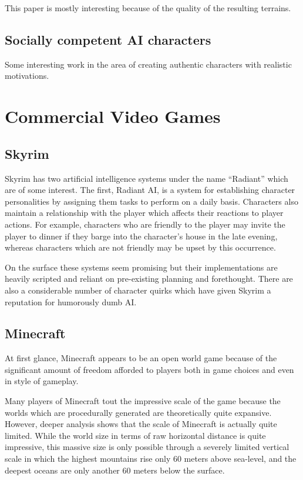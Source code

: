 This paper is mostly interesting because of the quality of the resulting terrains.

\subsection{Socially competent AI characters}

Some interesting work in the area of creating authentic characters with realistic motivations. \cite{socially_competent}

\section{Commercial Video Games}

\subsection{Skyrim}

Skyrim has two artificial intelligence systems under the name ``Radiant'' which are of some interest. The first, Radiant AI, is a system for establishing character personalities by assigning them tasks to perform on a daily basis. Characters also maintain a relationship with the player which affects their reactions to player actions. For example, characters who are friendly to the
player may invite the player to dinner if they barge into the character's house in the late evening, whereas characters which are not friendly may be upset by this occurrence.

On the surface these systems seem promising but their implementations are heavily scripted and reliant on pre-existing planning and forethought. There are also a considerable number of character quirks which have given Skyrim a reputation for humorously dumb AI. \cite{skyrim_gamespy} \cite{skyrim_ign} \cite{gameinformer_skyrimtech} \cite{skyrim_nesmith_radiant} \cite{skyrim_whatsnew}

\subsection{Minecraft}

At first glance, Minecraft appears to be an open world game because of the significant amount of freedom afforded to players both in game choices and even in style of gameplay.

Many players of Minecraft tout the impressive scale of the game because the worlds which are procedurally generated are theoretically quite expansive. However, deeper analysis shows that the scale of Minecraft is actually quite limited. While the world size in terms of raw horizontal distance is quite impressive, this massive size is only possible through a severely limited vertical scale in which the highest mountains rise only 60 meters above sea-level, and the deepest oceans are only another 60 meters below the surface.

